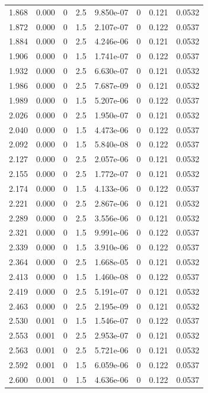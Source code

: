 \documentclass[preview]{standalone}
\begin{document}
{{{\begin{tabular}{L{1.2cm}C{1.2cm} C{0.3cm}C{0.5cm} C{1.4cm}C{1.4cm} C{1.4cm}C{1.4cm}}
  1.868  &  0.000  & 0     & 2.5 &  9.850e-07  & 0  & 0.121 &  0.0532   \\ 
  1.872  &  0.000  & 0     & 1.5 &  2.107e-07  & 0  & 0.122 &  0.0537   \\ 
  1.884  &  0.000  & 0     & 2.5 &  4.246e-06  & 0  & 0.121 &  0.0532   \\ 
  1.906  &  0.000  & 0     & 1.5 &  1.741e-07  & 0  & 0.122 &  0.0537   \\ 
  1.932  &  0.000  & 0     & 2.5 &  6.630e-07  & 0  & 0.121 &  0.0532   \\ 
  1.986  &  0.000  & 0     & 2.5 &  7.687e-09  & 0  & 0.121 &  0.0532   \\ 
  1.989  &  0.000  & 0     & 1.5 &  5.207e-06  & 0  & 0.122 &  0.0537   \\ 
  2.026  &  0.000  & 0     & 2.5 &  1.950e-07  & 0  & 0.121 &  0.0532   \\ 
  2.040  &  0.000  & 0     & 1.5 &  4.473e-06  & 0  & 0.122 &  0.0537   \\ 
  2.092  &  0.000  & 0     & 1.5 &  5.840e-08  & 0  & 0.122 &  0.0537   \\ 
  2.127  &  0.000  & 0     & 2.5 &  2.057e-06  & 0  & 0.121 &  0.0532   \\ 
  2.155  &  0.000  & 0     & 2.5 &  1.772e-07  & 0  & 0.121 &  0.0532   \\ 
  2.174  &  0.000  & 0     & 1.5 &  4.133e-06  & 0  & 0.122 &  0.0537   \\ 
  2.221  &  0.000  & 0     & 2.5 &  2.867e-06  & 0  & 0.121 &  0.0532   \\ 
  2.289  &  0.000  & 0     & 2.5 &  3.556e-06  & 0  & 0.121 &  0.0532   \\ 
  2.321  &  0.000  & 0     & 1.5 &  9.991e-06  & 0  & 0.122 &  0.0537   \\ 
  2.339  &  0.000  & 0     & 1.5 &  3.910e-06  & 0  & 0.122 &  0.0537   \\ 
  2.364  &  0.000  & 0     & 2.5 &  1.668e-05  & 0  & 0.121 &  0.0532   \\ 
  2.413  &  0.000  & 0     & 1.5 &  1.460e-08  & 0  & 0.122 &  0.0537   \\ 
  2.419  &  0.000  & 0     & 2.5 &  5.191e-07  & 0  & 0.121 &  0.0532   \\ 
  2.463  &  0.000  & 0     & 2.5 &  2.195e-09  & 0  & 0.121 &  0.0532   \\ 
  2.530  &  0.001  & 0     & 1.5 &  1.546e-07  & 0  & 0.122 &  0.0537   \\ 
  2.553  &  0.001  & 0     & 2.5 &  2.953e-07  & 0  & 0.121 &  0.0532   \\ 
  2.563  &  0.001  & 0     & 2.5 &  5.721e-06  & 0  & 0.121 &  0.0532   \\ 
  2.592  &  0.001  & 0     & 1.5 &  6.059e-06  & 0  & 0.122 &  0.0537   \\ 
  2.600  &  0.001  & 0     & 1.5 &  4.636e-06  & 0  & 0.122 &  0.0537   \\ 
\hline 
\end{tabular} 

}}}
\end{document}
